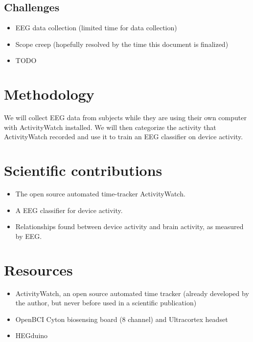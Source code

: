 \documentclass{IEEEtran}
\begin{document}
\subsection{Challenges}

\begin{itemize}
    \item EEG data collection (limited time for data collection)
    \item Scope creep (hopefully resolved by the time this document is finalized)
    \item TODO
\end{itemize}

\section{Methodology}

We will collect EEG data from subjects while they are using their own computer with ActivityWatch installed. We will then categorize the activity that ActivityWatch recorded and use it to train an EEG classifier on device activity.

\section{Scientific contributions}

\begin{itemize}
  \item The open source automated time-tracker ActivityWatch.
  \item A EEG classifier for device activity.
  \item Relationships found between device activity and brain activity, as measured by EEG\@.
\end{itemize}


\section{Resources}

\begin{itemize}
  \item ActivityWatch, an open source automated time tracker (already developed by the author, but never before used in a scientific publication)
  \item OpenBCI Cyton biosensing board (8 channel) and Ultracortex headset
  \item HEGduino
\end{itemize}

\bibbysegment{}

\nocite{*}
  {\list{}
     {\setlength{\leftmargin}{\bibhang}%
      \setlength{\itemindent}{-\leftmargin}%
      \setlength{\itemsep}{\bibitemsep}%
      \setlength{\parsep}{\bibparsep}}
  }
  {\endlist}
  {\item}
\printbibliography[notcategory=cited, env=bibnonum, heading=notcited]
\end{document}
